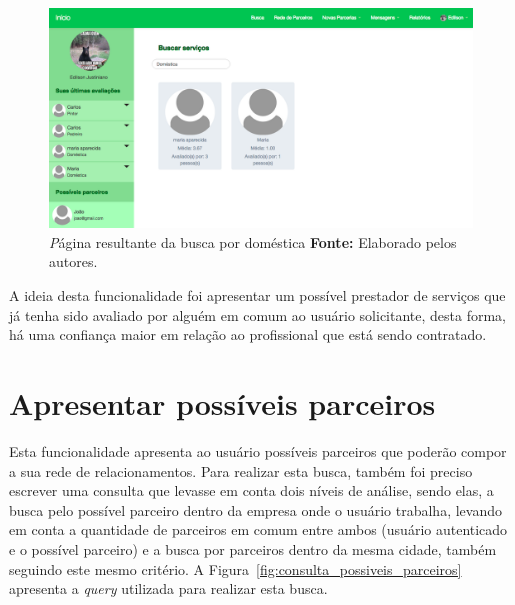 \newpage
\begin{figure}[h!]
	\centerline{\includegraphics[scale=0.35]{./imagens/busca-domestica-edilson.png}}
	\caption[\textit Página resultante da busca por doméstica.]
	{\textit Página resultante da busca por doméstica \textbf{Fonte:} Elaborado pelos autores.}
	\label{fig:busca_domestica_edilson}
\end{figure}

\par A ideia desta funcionalidade foi apresentar um possível prestador de serviços que já tenha sido avaliado por alguém em comum ao usuário solicitante, desta forma, há uma confiança maior em relação ao profissional que está sendo contratado.


\section{Apresentar possíveis parceiros}

\par Esta funcionalidade apresenta ao usuário possíveis parceiros que poderão compor a sua rede de relacionamentos. Para realizar esta busca, também foi preciso escrever uma consulta que levasse em conta dois níveis de análise, sendo elas, a busca pelo possível parceiro dentro da empresa onde o usuário trabalha, levando em conta a quantidade de parceiros em comum entre ambos (usuário autenticado e o possível parceiro) e a busca por parceiros dentro da mesma cidade, também seguindo este mesmo critério. A Figura~\ref{fig:consulta_possiveis_parceiros} apresenta a \textit{query} utilizada para realizar esta busca.

\newpage

